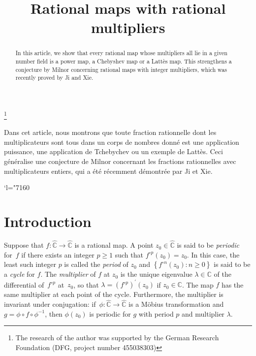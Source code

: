 \documentclass[JEP,XML,SOM,Unicode,published]{cedram}
\newcommand{\Changel}{\mathcode`l="7160}
\theoremstyle{plain}
\theoremstyle{definition}
\theoremstyle{remark}
\begin{document}
\frontmatter
\title{Rational maps with rational multipliers}

\author[\initial{V.} \lastname{Huguin}]{ }
\address{Constructor University Bremen gGmbH\\
Campus Ring 1, 28759 Bremen, Germany}
\urladdr{}
\thanks{The research of the author was supported by the German Research Foundation (DFG, project number 455038303)}


\begin{abstract}
In this article, we show that every rational map whose multipliers all lie in a given number field is a power map, a Chebyshev map or a Lattès map. This strengthens a conjecture by Milnor concerning rational maps with integer multipliers, which was recently proved by Ji and Xie.
\end{abstract}



\begin{altabstract}
Dans cet article, nous montrons que toute fraction rationnelle dont les multiplicateurs sont tous dans un corps de nombres donné est une application puissance, une application de Tchebychev ou un exemple de Lattès. Ceci généralise une conjecture de Milnor concernant les fractions rationnelles avec multiplicateurs entiers, qui a été récemment démontrée par Ji et Xie.
\end{altabstract}
\maketitle
\tableofcontents
\mainmatter
\Changel

\section{Introduction}

Suppose that $f \colon \widehat{\mathbb{C}} \to \widehat{\mathbb{C}}$ is a rational map. A point $z_{0} \in \widehat{\mathbb{C}}$ is said to be \emph{periodic} for~$f$ if there exists an integer $p \geq 1$ such that $f^{\circ p}(z_{0}) = z_{0}$. In this case, the least such integer $p$ is called the \emph{period} of $z_{0}$ and $\left\lbrace f^{\circ n}(z_{0}) : n \geq 0 \right\rbrace$ is said to be a \emph{cycle} for $f$. The \emph{multiplier} of $f$ at $z_{0}$ is the unique eigenvalue $\lambda \in \mathbb{C}$ of the differential of~$f^{\circ p}$ at~$z_{0}$, so that $\lambda = \left(f^{\circ p} \right)^{\prime}(z_{0})$ if $z_{0} \in \mathbb{C}$. The map $f$ has the same multiplier at each point of the cycle. Furthermore, the multiplier is invariant under conjugation: if~$\phi \colon \widehat{\mathbb{C}} \to \widehat{\mathbb{C}}$ is a Möbius transformation and $g = \phi \circ f \circ \phi^{-1}$, then $\phi(z_{0})$ is periodic for $g$ with period $p$ and multiplier $\lambda$.
\end{document}
